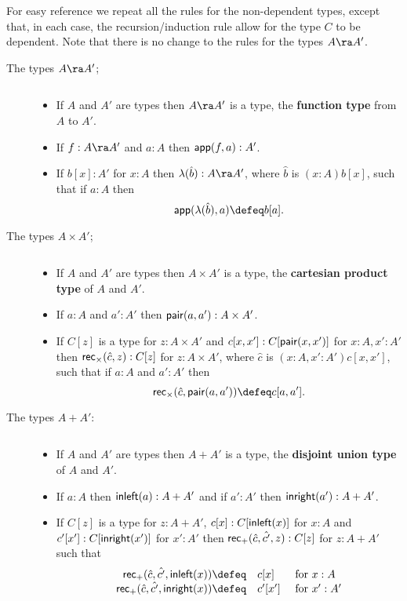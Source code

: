 {{For easy reference we repeat all the rules for the non-dependent types, except that, in each case, the recursion/induction rule allow for the type $C$ to be dependent.  Note that there is no change to the rules for the types $A\ra A'$.

\begin{description}
\item[The types $A\ra A'$;] $\;$
\begin{itemize}
\item If $A$ and $A'$ are types then $A\ra A'$ is a type, the {\bf function type} from $A$ to $A'$.
\item If $f:A\ra A'$ and $a:A$ then ${\sf app}(f,a):A'$.
\item If $b[x]:A'$ for $x:A$ then $\lambda(\hat{b}):A\ra A'$,
where $\hat{b}$ is $(x:A)b[x]$,
such that if $a:A$ then
  \[ \app(\lambda(\hat{b}),a)\defeq b[a].\]
\end{itemize}

\item[The types $A\times A'$;] $\;$
\begin{itemize}
\item If $A$ and $A'$ are types then $A\times A'$ is a type, the {\bf cartesian product type} of $A$ and $A'$.
\item If $a:A$ and $a':A'$ then ${\sf pair}(a,a'):A\times A'$.
\item If $C[z]$ is a type for $z:A\times A'$ and $c[x,x']:C[{\sf pair}(x,x')]$ for $x:A,x':A'$ then ${\sf rec}_\times(\hat{c},z):C[z]$ for $z:A\times A'$, where $\hat{c}$ is $(x:A,x':A')c[x,x']$, such that
if $a:A$ and $a':A'$ then
  \[ \rec_\times(\hat{c},\pair(a,a'))\defeq c[a,a'].\]
\end{itemize}

\item[The types $A+A'$:] $\;$
\begin{itemize}
\item If $A$ and $A'$ are types then $A+A'$ is a type, the {\bf disjoint union
type} of $A$ and $A'$.
\item If $a:A$ then ${\sf inleft}(a):A+A'$ and if $a':A'$ then ${\sf inright}(a'):A+A'$.
\item If $C[z]$ is a type for $z:A+A'$, $c[x]:C[{\sf inleft}(x)]$ for $x:A$ and $c'[x']:C[{\sf inright}(x')]$ for $x':A'$ then 
${\sf rec}_+(\hat{c},\hat{c'},z):C[z]$ for $z:A+A'$ such that
  \[\begin{array}{rll}
\rec_+(\hat{c},\hat{c'},\inleft(x))  \defeq& c[x]  &\mbox{ for }x:A\\
\rec_+(\hat{c},\hat{c'},\inright(x)) \defeq& c'[x']&\mbox{ for }x':A'
  \end{array}\]
\end{itemize}


\end{description}}}
